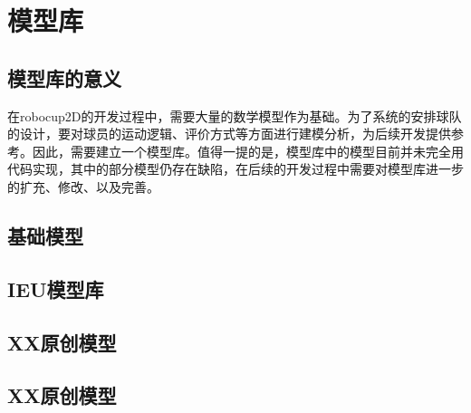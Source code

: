 \chapter{模型库}
\section{模型库的意义}
在robocup2D的开发过程中，需要大量的数学模型作为基础。为了系统的安排球队的设计，要对球员的运动逻辑、评价方式等方面进行建模分析，为后续开发提供参考。因此，需要建立一个模型库。值得一提的是，模型库中的模型目前并未完全用代码实现，其中的部分模型仍存在缺陷，在后续的开发过程中需要对模型库进一步的扩充、修改、以及完善。
\section{基础模型}


\section{IEU模型库}


\section{XX原创模型}


\section{XX原创模型}

